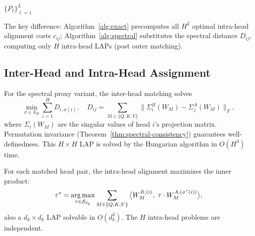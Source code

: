 \begin{algorithm}[htbp]
    \caption{Wreath Alignment (Spectral Proxy)}
    \label{alg:spectral}
    \BlankLine
    \Return $\{P_\ell\}_{\ell=1}^{L}$\;
\end{algorithm}

The key difference: Algorithm~\ref{alg:exact} precomputes all $H^2$ optimal intra-head alignment costs $c_{ij}$; Algorithm~\ref{alg:spectral} substitutes the spectral distance $D_{ij}$, computing only $H$ intra-head LAPs (post outer matching).

\subsection{Inter-Head and Intra-Head Assignment}

For the spectral proxy variant, the inter-head matching solves
\begin{equation}\label{eq:lap-inter}
    \min_{\sigma \in \mathcal{S}_H} \sum_{i=1}^{H} D_{i, \sigma(i)},\quad
    D_{ij} = \sum_{M \in \{Q,K,V\}} \big\| \Sigma_i^{B}(W_M) - \Sigma_j^{A}(W_M) \big\|_F,
\end{equation}
where $\Sigma_i(W_M)$ are the singular values of head $i$'s projection matrix. Permutation invariance (Theorem~\ref{thm:spectral-consistency}) guarantees well-definedness. This $H \times H$ LAP is solved by the Hungarian algorithm in $O(H^3)$ time.

For each matched head pair, the intra-head alignment maximizes the inner product:
\begin{equation}\label{eq:lap-intra}
    \tau^* = \operatorname*{arg\,max}_{\tau \in \mathcal{S}_{d_k}} \sum_{M \in \{Q,K,V\}} \big\langle W_M^{B,(i)},\; \tau \cdot W_M^{A,(\sigma^*(i))} \big\rangle,
\end{equation}
also a $d_k \times d_k$ LAP solvable in $O(d_k^3)$. The $H$ intra-head problems are independent.

